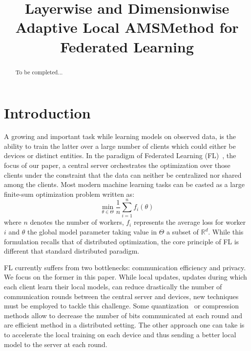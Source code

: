 \documentclass{article}
\begin{document}
\title{Layerwise and Dimensionwise Adaptive Local AMSMethod for Federated Learning}


\date{}
\maketitle

\begin{abstract}
To be completed...
\end{abstract}

\section{Introduction}\label{sec:introduction}

A growing and important task while learning models on observed data, is the ability to train the latter over a large number of clients which could either be devices or distinct entities.
In the paradigm of Federated Learning (FL)~\citep{konevcny2016federated,mcmahan2017communication}, the focus of our paper, a central server orchestrates the optimization over those clients under the constraint that the data can neither be centralized nor shared among the clients.
Most modern machine learning tasks can be casted as a large finite-sum optimization problem written as:
\begin{equation}
\min \limits_{\theta \in \Theta} \frac{1}{n} \sum_{i=1}^n f_i(\theta)
\end{equation}
where $n$ denotes the number of workers, $f_i$ represents the average loss for worker $i$ and $\theta$ the global model parameter taking value in $\Theta$ a subset of $\mathbb{R}^d$.
While this formulation recalls that of distributed optimization, the core principle of FL is different that standard distributed paradigm.

FL currently suffers from two bottlenecks: communication efficiency and privacy.
We focus on the former in this paper.
While local updates, updates during which each client learn their local models, can reduce drastically the number of communication rounds between the central server and devices, new techniques must be employed to tackle this challenge.
Some quantization~\citep{alistarh2017qsgd, wangni2018gradient} or compression~\citep{lin2017deep} methods allow to decrease the number of bits communicated at each round and are efficient method in a distributed setting.
The other approach one can take is to accelerate the local training on each device and thus sending a better local model to the server at each round.
\end{document}
